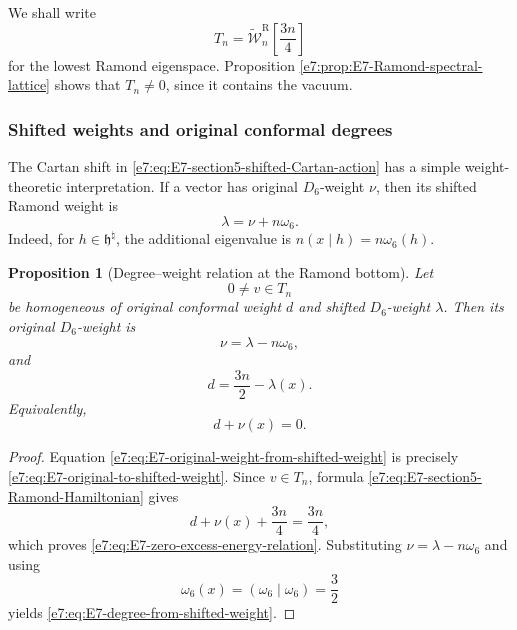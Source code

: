\documentclass[11pt,reqno]{amsart}
\newtheorem{proposition}[theorem]{Proposition}
\theoremstyle{definition}
\theoremstyle{remark}
\begin{document}
We shall write
\begin{equation*}
  T_n
  =\widetilde{\mathcal W}_n^{\mathrm R}
   \!\left[\frac{3n}{4}\right]
\end{equation*}
for the lowest Ramond eigenspace.  Proposition
\ref{e7:prop:E7-Ramond-spectral-lattice} shows that \(T_n\neq0\), since it
contains the vacuum.

\subsubsection{Shifted weights and original conformal degrees}


The Cartan shift in
\eqref{e7:eq:E7-section5-shifted-Cartan-action} has a simple weight-theoretic
interpretation.  If a vector has original \(D_6\)-weight \(\nu\), then its
shifted Ramond weight is
\begin{equation}
  \lambda=\nu+n\omega_6.
  \label{e7:eq:E7-original-to-shifted-weight}
\end{equation}
Indeed, for \(h\in\mathfrak h^\natural\), the additional eigenvalue is
\(n(x\mid h)=n\omega_6(h)\).

\begin{proposition}[Degree--weight relation at the Ramond bottom]
\label{e7:prop:E7-degree-weight-relation}
Let
\[
  0\ne v\in T_n
\]
be homogeneous of original conformal weight \(d\) and shifted
\(D_6\)-weight \(\lambda\).  Then its original \(D_6\)-weight is
\begin{equation}
  \nu=\lambda-n\omega_6,
  \label{e7:eq:E7-original-weight-from-shifted-weight}
\end{equation}
and
\begin{equation}
  d
  =\frac{3n}{2}-\lambda(x).
  \label{e7:eq:E7-degree-from-shifted-weight}
\end{equation}
Equivalently,
\begin{equation}
  d+\nu(x)=0.
  \label{e7:eq:E7-zero-excess-energy-relation}
\end{equation}
\end{proposition}

\begin{proof}
Equation \eqref{e7:eq:E7-original-weight-from-shifted-weight} is precisely
\eqref{e7:eq:E7-original-to-shifted-weight}.  Since
\(v\in T_n\), formula
\eqref{e7:eq:E7-section5-Ramond-Hamiltonian} gives
\[
  d+\nu(x)+\frac{3n}{4}=\frac{3n}{4},
\]
which proves \eqref{e7:eq:E7-zero-excess-energy-relation}.  Substituting
\(\nu=\lambda-n\omega_6\) and using
\[
  \omega_6(x)=(\omega_6\mid\omega_6)=\frac32
\]
yields \eqref{e7:eq:E7-degree-from-shifted-weight}.
\end{proof}
\end{document}
